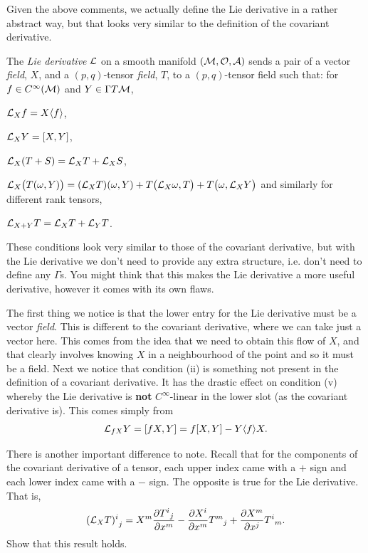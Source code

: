 \documentclass[12pt]{article} %
\begin{document}
Given the above comments, we actually define the Lie derivative in a rather abstract way, but that looks very similar to the definition of the covariant derivative. 

    The \textit{Lie derivative} $\mathcal{L}$ on a smooth manifold $(\mathcal{M},\mathcal{O},\mathcal{A})$ sends a pair of a vector \textit{field}, $X$, and a $(p,q)$-tensor \textit{field}, $T$, to a $(p,q)$-tensor field such that: for $f\in C^{\infty}(\mathcal{M})$ and $Y\in\Gamma T\mathcal{M}$,
    \benr 
        \item $\mathcal{L}_X f= X\langle f\rangle$, 
        \item $\mathcal{L}_XY = [X,Y]$,
        \item $\mathcal{L}_X(T+S) = \mathcal{L}_XT+\mathcal{L}_XS$,
        \item $\mathcal{L}_X\big(T(\omega,Y)\big) = (\mathcal{L}_XT)(\omega,Y) + T\big(\mathcal{L}_X\omega,T\big)+T\big(\omega,\mathcal{L}_XY\big)$ and similarly for different rank tensors,
        \item $\mathcal{L}_{X+Y}T = \mathcal{L}_XT + \mathcal{L}_YT$.
    \een 
\ed 

These conditions look very similar to those of the covariant derivative, but with the Lie derivative we don't need to provide any extra structure, i.e. don't need to define any $\Gamma$s. You might think that this makes the Lie derivative a more useful derivative, however it comes with its own flaws. 

The first thing we notice is that the lower entry for the Lie derivative must be a vector \textit{field}. This is different to the covariant derivative, where we can take just a vector here. This comes from the idea that we need to obtain this flow of $X$, and that clearly involves knowing $X$ in a neighbourhood of the point and so it must be a field. Next we notice that condition (ii) is something not present in the definition of a covariant derivative. It has the drastic effect on condition (v) whereby the Lie derivative is \textbf{not} $C^{\infty}$-linear in the lower slot (as the covariant derivative is). This comes simply from 
\begin{align*} 
    \mathcal{L}_{fX}Y = [fX,Y] = f[X,Y] - Y\langle f \rangle X.
\end{align*} 

\bbox 
    There is another important difference to note. Recall that for the components of the covariant derivative of a tensor, each upper index came with a $+$ sign and each lower index came with a $-$ sign. The opposite is true for the Lie derivative. That is, 
    \begin{align*} 
        {(\mathcal{L}_XT)^i}_j = X^m \frac{\partial {T^i}_j}{\partial x^m} - \frac{\partial X^i}{\partial x^m} {T^m}_j + \frac{\partial X^m}{\partial x^j}{T^i}_m.
    \end{align*} 
    Show that this result holds.
\ebox 
\end{document}
